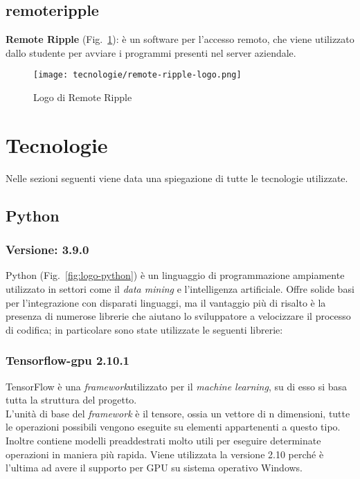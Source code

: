 \subsection{remoteripple}
\textbf{Remote Ripple} (Fig.~\ref{fig:logo-remoteripple}): è un software per l'accesso remoto, che viene utilizzato dallo studente per avviare i programmi presenti nel server aziendale.
    
\begin{figure}[!h] 
    \centering 
    \texttt{[image: tecnologie/remote-ripple-logo.png]} 
    \caption{Logo di Remote Ripple}
    \label{fig:logo-remoteripple}
  \end{figure}


\newpage

\section{Tecnologie}
\label{sec:tecnologie-strumenti}

Nelle sezioni seguenti viene data una spiegazione di tutte le tecnologie utilizzate.

\subsection{Python}

\subsubsection{Versione: 3.9.0}
Python (Fig.~\ref{fig:logo-python}) è un linguaggio di programmazione ampiamente utilizzato in settori come il \emph{data mining} e l'intelligenza artificiale. 
Offre solide basi per l'integrazione con disparati linguaggi, ma il vantaggio più di risalto è la presenza di numerose librerie che aiutano lo sviluppatore a velocizzare il processo di codifica; in particolare sono state utilizzate le seguenti librerie:

\subsubsection{\label{tec:tensorflow}Tensorflow-gpu 2.10.1}

TensorFlow è una \emph{\gls{framework}}\glsfirstoccur utilizzato per il \emph{machine learning}, su di esso si basa tutta la struttura del progetto.\\
L'unità di base del \emph{\gls{framework}} è il tensore, ossia un vettore di n dimensioni, tutte le operazioni possibili vengono eseguite su elementi appartenenti a questo tipo.
Inoltre contiene modelli preaddestrati molto utili per eseguire determinate operazioni in maniera più rapida. 
Viene utilizzata la versione 2.10 perché è l'ultima ad avere il supporto per GPU su sistema operativo Windows.

